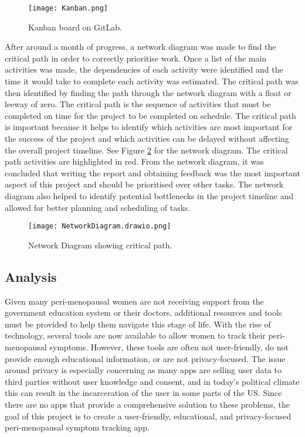 \begin{figure}[h!!]
  \begin{center}
    \texttt{[image: Kanban.png]}
    \caption{Kanban board on GitLab.}
    \label{figure:kanban-board}
  \end{center}
\end{figure}

After around a month of progress, a network diagram was made to find the critical path in order to correctly prioritise work. Once a list of the main activities was made, the dependencies of each activity were identified and the time it would take to complete each activity was estimated. The critical path was then identified by finding the path through the network diagram with a float or leeway of zero. The critical path is the sequence of activities that must be completed on time for the project to be completed on schedule. The critical path is important because it helps to identify which activities are most important for the success of the project and which activities can be delayed without affecting the overall project timeline. See Figure \ref{figure:network-diagram} for the network diagram. The critical path activities are highlighted in red. From the network diagram, it was concluded that writing the report and obtaining feedback was the most important aspect of this project and should be prioritised over other tasks. The network diagram also helped to identify potential bottlenecks in the project timeline and allowed for better planning and scheduling of tasks.

\begin{figure}[h!!]
  \begin{center}
    \texttt{[image: NetworkDiagram.drawio.png]}
    \caption{Network Diagram showing critical path.}
    \label{figure:network-diagram}
  \end{center}
\end{figure}
 
\subsection{Analysis}
Given many peri-menopausal women are not receiving support from the government education system or their doctors\cite{Aljumah2023}\cite{MenopauseSupport2021}\cite{UCL2023}, additional resources and tools must be provided to help them navigate this stage of life. With the rise of technology, several tools are now available to allow women to track their peri-menopausal symptoms. However, these tools are often not user-friendly, do not provide enough educational information, or are not privacy-focused. The issue around privacy is especially concerning as many apps are selling user data to third parties without user knowledge and consent, and in today's political climate this can result in the incarceration of the user in some parts of the US\cite{Kelly2023}. Since there are no apps that provide a comprehensive solution to these problems, the goal of this project is to create a user-friendly, educational, and privacy-focused peri-menopausal symptom tracking app.

